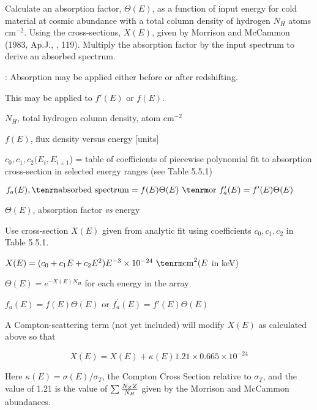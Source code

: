 {\listlist


Calculate an absorption factor, $\Theta (E)$, as a function of input energy for cold
material at cosmic abundance with a total column density of hydrogen $N_H$
atoms cm$^{-2}$.  Using the cross-sections, $X(E)$, given by Morrison and McCammon
(1983, Ap.J., , 119).  Multiply the absorption factor by the input
spectrum to derive an absorbed spectrum.
 
:  Absorption may be applied either before or after redshifting.

This may be applied to $f'(E)$ or $f(E)$.


$N_H$, total hydrogen column density, atom cm$^{-2}$
 
$f(E)$, flux density versus energy [units]
 
$c_0, c_1, c_2 (E_i, E_{i\pm1}$) = table of coefficients of
piecewise polynomial fit to absorption cross-section in selected energy
ranges (see Table 5.5.1)


$f_{a}(E), {\rm absorbed~spectrum} = f(E)\Theta(E)~{\rm or}~f_{a}^{\prime}(E)
 = f^{\prime}(E)\Theta(E)$
 
$\Theta (E)$, absorption factor {\it vs} energy

 
Use cross-section $X(E)$ given from analytic fit using coefficients $c_0,
c_1, c_2$ in Table 5.5.1.
 
$X(E) = (c_0 +c_1 E+c_2 E^2) E^{-3} \times 10^{-24}~{\rm cm}^{2} (E$ in keV)

$\Theta(E) = e^{-X(E) N_H}$ for each energy in the array
 
$f_a(E) = f(E)\Theta (E)$ or $f_{a}^{\prime}(E) = f'(E)\Theta (E)$

}

\vskip 18pt

{\listlist

A Compton-scattering term (not yet included) will modify $X(E)$ as
calculated
above so that

}

$$X(E) = X(E) + \kappa(E) 1.21 \times 0.665 \times 10^{-24}$$

\itemitem{}Here $\kappa(E) = \sigma(E)/\sigma_T$, the Compton Cross Section
relative to $\sigma_T$, and the value of 1.21 is the value of
$\sum {{N_Z Z} \over N_H}$ given by the Morrison and McCammon abundances.

